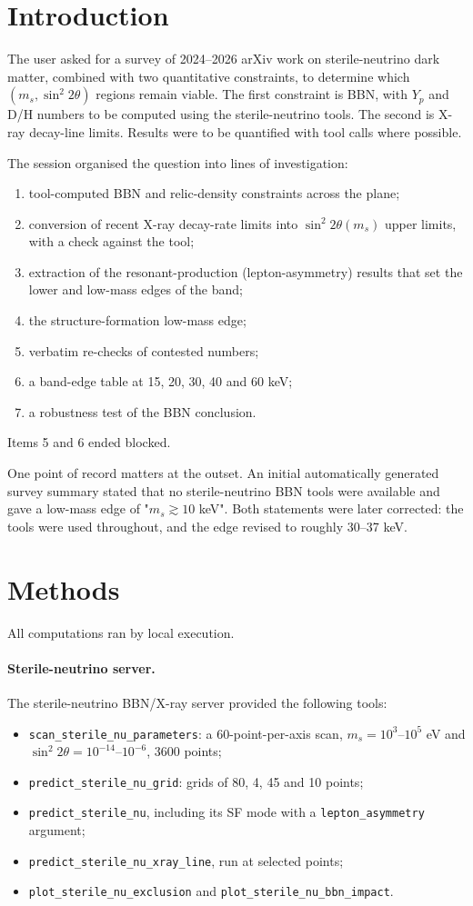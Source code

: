 \documentclass[11pt,a4paper]{article}
\begin{document}
\section{Introduction}
The user asked for a survey of 2024--2026 arXiv work on sterile-neutrino dark matter, combined with two quantitative constraints, to determine which $(m_s,\sin^2 2\theta)$ regions remain viable. The first constraint is BBN, with $Y_p$ and D/H numbers to be computed using the sterile-neutrino tools. The second is X-ray decay-line limits. Results were to be quantified with tool calls where possible.

The session organised the question into lines of investigation:
\begin{enumerate}
\item tool-computed BBN and relic-density constraints across the plane;
\item conversion of recent X-ray decay-rate limits into $\sin^2 2\theta(m_s)$ upper limits, with a check against the tool;
\item extraction of the resonant-production (lepton-asymmetry) results that set the lower and low-mass edges of the band;
\item the structure-formation low-mass edge;
\item verbatim re-checks of contested numbers;
\item a band-edge table at 15, 20, 30, 40 and 60 keV;
\item a robustness test of the BBN conclusion.
\end{enumerate}
Items 5 and 6 ended blocked.

One point of record matters at the outset. An initial automatically generated survey summary stated that no sterile-neutrino BBN tools were available and gave a low-mass edge of "$m_s\gtrsim10$ keV". Both statements were later corrected: the tools were used throughout, and the edge revised to roughly 30--37 keV.

\section{Methods}
All computations ran by local execution.

\paragraph{Sterile-neutrino server.} The sterile-neutrino BBN/X-ray server provided the following tools:
\begin{itemize}
\item \texttt{scan\_sterile\_nu\_parameters}: a 60-point-per-axis scan, $m_s=10^3$--$10^5$ eV and $\sin^2 2\theta=10^{-14}$--$10^{-6}$, 3600 points;
\item \texttt{predict\_sterile\_nu\_grid}: grids of 80, 4, 45 and 10 points;
\item \texttt{predict\_sterile\_nu}, including its SF mode with a \texttt{lepton\_asymmetry} argument;
\item \texttt{predict\_sterile\_nu\_xray\_line}, run at selected points;
\item \texttt{plot\_sterile\_nu\_exclusion} and \texttt{plot\_sterile\_nu\_bbn\_impact}.
\end{itemize}
\end{document}
